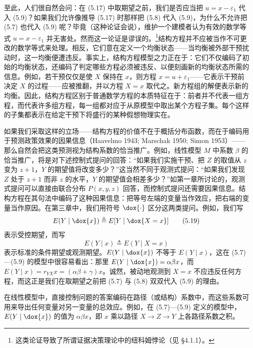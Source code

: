 至此，人们很自然会问：在 \textup{(5.17)} 中取期望之前，我们是否应当把 $u=x-\varepsilon_1$ 代入 \textup{(5.9)}？如果我们允许像推导 \textup{(5.17)} 时那样把 \textup{(5.8)} 代入 \textup{(5.9)}，为什么不允许把 \textup{(5.7)} 也代入 \textup{(5.9)} 呢？毕竟（这种论证会说），维护一个建模者认为有效的数学等式 $u=x-\varepsilon_1$ 并无害处。然而这一论证是谬误的。\footnote{这类论证导致了所谓证据决策理论中的纽科姆悖论（见 \S 4.1.1）。}结构方程并不应被当作不可更改的数学等式来处理。相反，它们意在定义一个均衡状态——当均衡被外部干预扰动时，这一均衡便遭违反。事实上，结构方程模型之力正在于：它们不仅编码了初始的均衡状态，还编码了判定哪些方程必须被违反、以便刻画新的均衡状态所需的信息。例如，若干预仅仅是使 $X$ 保持在 $x$，则方程 $x=u+\varepsilon_1$——它表示干预前决定 $X$ 的过程——应被推翻，并以方程 $X=x$ 取代之。新方程组的解便表示新的均衡。因此，结构方程区别于普通数学方程的本质特征在于：前者并不代表一组方程，而代表许多组方程，每一组都对应于从原模型中取出某个方程子集。每个这样的子集都表示在给定干预下将盛行的某种假想物理实在。

如果我们采取这样的立场——结构方程的价值不在于概括分布函数，而在于编码用于预测政策效果的因果信息（Haavelmo 1943; Marschak 1950; Simon 1953）——那么自然会把这类预测视为结构系数的恰当推广。例如，线性模型 $M$ 中系数 $\beta$ 的恰当推广，将是对下述控制式提问的回答：“如果我们实施干预、把 $Z$ 的取值从 $z$ 变为 $z+1$，$Y$ 的期望值将改变多少？”这当然不同于观测式提问：“如果我们发现 $Z$ 处于 $z+1$ 而非 $z$ 的水平，$Y$ 的期望值会相差多少？”如第一章所讨论的，观测式提问可以直接由联合分布 $P(x,y,z)$ 回答，而控制式提问还需要因果信息。结构方程在其句法中编码了这种因果信息：把等号左端的变量当作效应，把右端的变量当作原因。在第三章中，我们用符号 $\dox{\cdot}$ 区分这两类提问。例如，我们写
\begin{equation}
E(Y\mid \dox{x})\triangleq E[Y\mid \dox{X=x}] \tag{5.19}
\end{equation}
表示受控期望，而写
\begin{equation}
E(Y\mid x)\triangleq E(Y\mid X=x) \tag{5.20}
\end{equation}
表示标准的条件期望或观测期望。$E(Y\mid \dox{x})$ 不等于 $E(Y\mid x)$，这在 \textup{(5.7)}—\textup{(5.9)} 的模型中很容易看出：那里 $E(Y\mid \dox{x})=\alpha\beta x$，而 $E(Y\mid x)=r_{YX}x=(\alpha\beta+\gamma)x$。诚然，被动地观测到 $X=x$ 不应违反任何方程，而这正是我们在取期望之前把 \textup{(5.7)} 与 \textup{(5.8)} 双双代入 \textup{(5.9)} 的理由。

在线性模型中，直接控制问题的答案编码在路径（或结构）系数中，而这些系数可用来导出任何变量对另一变量的总效应。例如，在 \textup{(5.7)}—\textup{(5.9)} 定义的模型中，$E(Y\mid \dox{x})$ 的值为 $\alpha\beta x$，即 $x$ 乘以路径 $X\to Z\to Y$ 上各路径系数之积。

